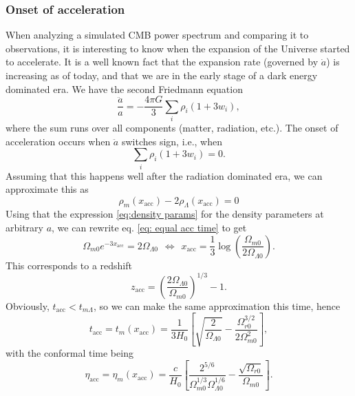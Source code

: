 \documentclass{aa}
\numberwithin{equation}{section}
\numberwithin{table}{section}
\numberwithin{figure}{section}
\begin{document}
\subsubsection{Onset of acceleration}
When analyzing a simulated CMB power spectrum and comparing it to observations, it is interesting to know when the expansion of the Universe started to accelerate. It is a well known fact that the expansion rate (governed by $\dot{a}$) is increasing as of today, and that we are in the early stage of a dark energy dominated era. We have the second Friedmann equation
\begin{equation}
    \frac{\ddot{a}}{a} = -\frac{4\pi G}{3}\sum_i \rho_i\left(1 + 3w_i \right),
\end{equation}
where the sum runs over all components (matter, radiation, etc.). The onset of acceleration occurs when $\ddot{a}$ switches sign, i.e., when
\begin{equation}
    \sum_i \rho_i\left(1 + 3w_i \right) = 0.
\end{equation}
Assuming that this happens well after the radiation dominated era, we can approximate this as
\begin{equation}
  \rho_m(x_\text{acc})- 2\rho_\Lambda(x_\text{acc}) = 0 \label{eq: equal acc time}
\end{equation}
Using that the expression \eqref{eq:density params} for the density parameters at arbitrary $a$, we can rewrite eq. \eqref{eq: equal acc time} to get
\begin{equation}
  \Omega_{m0}e^{-3x_\text{acc}} = 2\Omega_{\Lambda0}
  \hspace{5pt}\Leftrightarrow\hspace{5pt}
  x_\text{acc} = \frac{1}{3}\log\left(\frac{\Omega_{m0}}{2\Omega_{\Lambda0}}\right).
\end{equation}
This corresponds to a redshift
\begin{equation}
  z_\text{acc} = \left(\frac{2\Omega_{\Lambda0}}{\Omega_{m0}}\right)^{1/3}-1.
\end{equation}
Obviously, $t_\text{acc}<t_{m\Lambda}$, so we can make the same approximation this time, hence
\begin{equation}
    t_\text{acc} = t_m(x_\text{acc}) = \frac{1}{3H_0}\left[\sqrt{\frac{2}{\Omega_{\Lambda0}}} -\frac{\Omega_{r0}^{3/2}}{2\Omega_{m0}^2}\right],
\end{equation}
with the conformal time being
\begin{equation}
    \eta_\text{acc} = \eta_m(x_\text{acc}) = \frac{c}{H_0}\left[\frac{2^{5/6}}{\Omega_{m0}^{1/3}\Omega_{\Lambda0}^{1/6}} - \frac{\sqrt{\Omega_{r0}}}{\Omega_{m0}}\right].
\end{equation}
\end{document}

